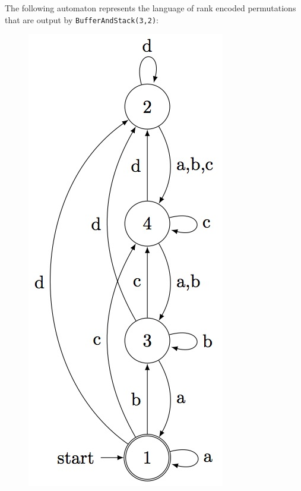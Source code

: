 \documentclass[a4paper,11pt]{report}
\begin{document}
{{{      The following automaton represents the language of rank encoded permutations that are output by \texttt{BufferAndStack(3,2)}:
      \begin{figure}[H] \begin{center} \leavevmode \includegraphics[scale=0.75]{img/bs32aut.jpg} \end{center} \end{figure}
      
}}}
\end{document}
